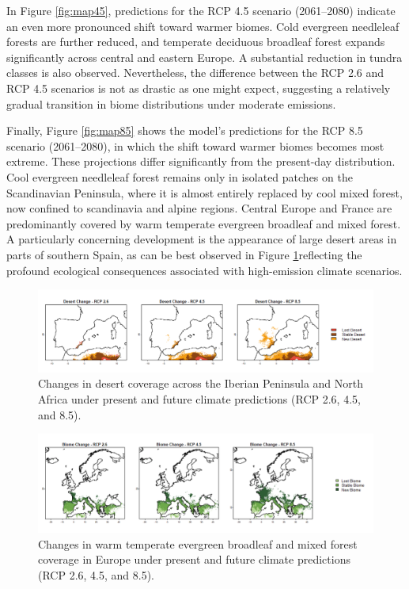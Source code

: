 \documentclass[
]{krantz}
\begin{document}
In Figure \ref{fig:map45}, predictions for the RCP 4.5 scenario (2061--2080) indicate an even more pronounced shift toward warmer biomes. Cold evergreen needleleaf forests are further reduced, and temperate deciduous broadleaf forest expands significantly across central and eastern Europe. A substantial reduction in tundra classes is also observed. Nevertheless, the difference between the RCP 2.6 and RCP 4.5 scenarios is not as drastic as one might expect, suggesting a relatively gradual transition in biome distributions under moderate emissions.

Finally, Figure \ref{fig:map85} shows the model's predictions for the RCP 8.5 scenario (2061--2080), in which the shift toward warmer biomes becomes most extreme. These projections differ significantly from the present-day distribution. Cool evergreen needleleaf forest remains only in isolated patches on the Scandinavian Peninsula, where it is almost entirely replaced by cool mixed forest, now confined to scandinavia and alpine regions. Central Europe and France are predominantly covered by warm temperate evergreen broadleaf and mixed forest. A particularly concerning development is the appearance of large desert areas in parts of southern Spain, as can be best observed in Figure \ref{fig:desertchange}reflecting the profound ecological consequences associated with high-emission climate scenarios.

\begin{figure}

{\centering \includegraphics[width=1\linewidth]{work/05-naturalveg/figures/desert_change2} 

}

\caption{Changes in desert coverage across the Iberian Peninsula and North Africa under present and future climate predictions (RCP 2.6, 4.5, and 8.5).}\label{fig:desertchange}
\end{figure}

\begin{figure}

{\centering \includegraphics[width=1\linewidth]{work/05-naturalveg/figures/temp_change} 

}

\caption{ Changes in warm temperate evergreen broadleaf and mixed forest coverage in Europe under present and future climate predictions (RCP 2.6, 4.5, and 8.5). }\label{fig:biomechange}
\end{figure}
\end{document}
